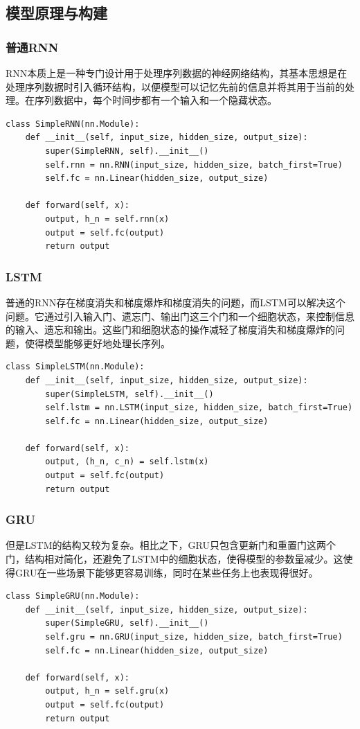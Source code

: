 \documentclass{article}
\begin{document}
\subsection{模型原理与构建}
\subsubsection{普通RNN}
RNN本质上是一种专门设计用于处理序列数据的神经网络结构，其基本思想是在处理序列数据时引入循环结构，以便模型可以记忆先前的信息并将其用于当前的处理。在序列数据中，每个时间步都有一个输入和一个隐藏状态。
\begin{lstlisting}
class SimpleRNN(nn.Module):
    def __init__(self, input_size, hidden_size, output_size):
        super(SimpleRNN, self).__init__()
        self.rnn = nn.RNN(input_size, hidden_size, batch_first=True)
        self.fc = nn.Linear(hidden_size, output_size)

    def forward(self, x):
        output, h_n = self.rnn(x)
        output = self.fc(output)
        return output
\end{lstlisting}

\subsubsection{LSTM}
普通的RNN存在梯度消失和梯度爆炸和梯度消失的问题，而LSTM可以解决这个问题。它通过引入输入门、遗忘门、输出门这三个门和一个细胞状态，来控制信息的输入、遗忘和输出。这些门和细胞状态的操作减轻了梯度消失和梯度爆炸的问题，使得模型能够更好地处理长序列。
\begin{lstlisting}
class SimpleLSTM(nn.Module):
    def __init__(self, input_size, hidden_size, output_size):
        super(SimpleLSTM, self).__init__()
        self.lstm = nn.LSTM(input_size, hidden_size, batch_first=True)
        self.fc = nn.Linear(hidden_size, output_size)

    def forward(self, x):
        output, (h_n, c_n) = self.lstm(x)
        output = self.fc(output)
        return output
\end{lstlisting}

\subsubsection{GRU}
但是LSTM的结构又较为复杂。相比之下，GRU只包含更新门和重置门这两个门，结构相对简化，还避免了LSTM中的细胞状态，使得模型的参数量减少。这使得GRU在一些场景下能够更容易训练，同时在某些任务上也表现得很好。
\begin{lstlisting}
class SimpleGRU(nn.Module):
    def __init__(self, input_size, hidden_size, output_size):
        super(SimpleGRU, self).__init__()
        self.gru = nn.GRU(input_size, hidden_size, batch_first=True)
        self.fc = nn.Linear(hidden_size, output_size)

    def forward(self, x):
        output, h_n = self.gru(x)
        output = self.fc(output)
        return output
\end{lstlisting}
\end{document}
